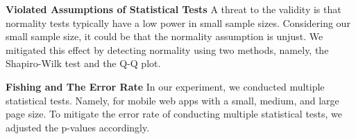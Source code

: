 \noindent \textbf{Violated Assumptions of Statistical Tests}
A threat to the validity is that normality tests typically have a low power in small sample sizes. Considering our small sample size, it could be that the normality assumption is unjust. We mitigated this effect by detecting normality using two methods, namely, the Shapiro-Wilk test and the Q-Q plot. 

\noindent \textbf{Fishing and The Error Rate}
In our experiment, we conducted multiple statistical tests. Namely, for mobile web apps with a small, medium, and large page size. To mitigate the error rate of conducting multiple statistical tests, we adjusted the p-values accordingly.


